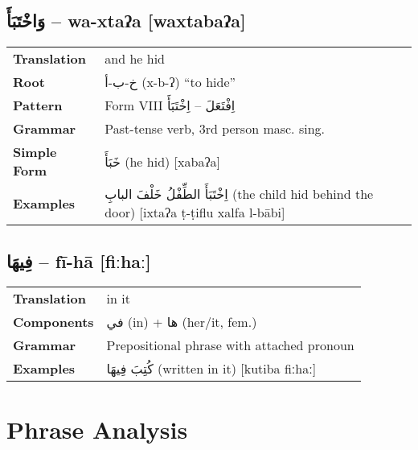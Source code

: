 \documentclass[a4paper,12pt]{article}
\begin{document}
\subsection{\textarabic{وَاخْتَبَأَ} – \textbf{wa-xtaʔa} [waxtabaʔa]}
\begin{tabular}{p{3cm}p{10cm}}
\toprule
\textbf{Translation} & and he hid\\
\textbf{Root} & \textarabic{خ-ب-أ} (x-b-ʔ) “to hide”\\
\textbf{Pattern} & Form VIII \textarabic{اِفْتَعَلَ} – \textarabic{اِخْتَبَأَ}\\
\textbf{Grammar} & Past-tense verb, 3rd person masc. sing.\\
\textbf{Simple Form} & \textarabic{خَبَأَ} (he hid) [xabaʔa]\\
\textbf{Examples} & \textarabic{اِخْتَبَأَ الطِّفْلُ خَلْفَ البابِ} (the child hid behind the door) [ixtaʔa ṭ-ṭiflu xalfa l-bābi]\\
\bottomrule
\end{tabular}

\subsection{\textarabic{فِيهَا} – \textbf{fī-hā} [fiːhaː]}
\begin{tabular}{p{3cm}p{10cm}}
\toprule
\textbf{Translation} & in it\\
\textbf{Components} & \textarabic{في} (in) + \textarabic{ها} (her/it, fem.)\\
\textbf{Grammar} & Prepositional phrase with attached pronoun\\
\textbf{Examples} & \textarabic{كُتِبَ فِيهَا} (written in it) [kutiba fiːhaː]\\
\bottomrule
\end{tabular}

\section{Phrase Analysis}
\end{document}
